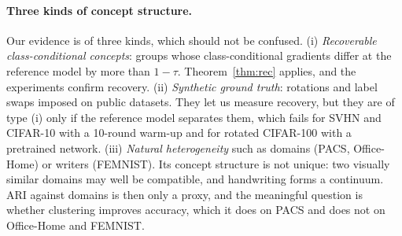 \paragraph{Three kinds of concept structure.} Our evidence is of three kinds, which should not be confused. (i) \emph{Recoverable class-conditional concepts}: groups whose class-conditional gradients differ at the reference model by more than $1-\tau$. Theorem~\ref{thm:rec} applies, and the experiments confirm recovery. (ii) \emph{Synthetic ground truth}: rotations and label swaps imposed on public datasets. They let us measure recovery, but they are of type (i) only if the reference model separates them, which fails for SVHN and CIFAR-10 with a 10-round warm-up and for rotated CIFAR-100 with a pretrained network. (iii) \emph{Natural heterogeneity} such as domains (PACS, Office-Home) or writers (FEMNIST). Its concept structure is not unique: two visually similar domains may well be compatible, and handwriting forms a continuum. ARI against domains is then only a proxy, and the meaningful question is whether clustering improves accuracy, which it does on PACS and does not on Office-Home and FEMNIST.

